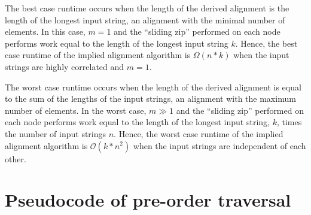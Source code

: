 \documentclass[11pt]{article}
\begin{document}
The best case runtime occurs when the length of the derived alignment is the length of the longest input string, an alignment with the minimal number of elements.
In this case, $m = 1$ and the ``sliding zip'' performed on each node performs work equal to the length of the longest input string $k$.
Hence, the best case runtime of the implied alignment algorithm is $\Omega(n*k)$ when the input strings are highly correlated and $m = 1$.

The worst case runtime occurs when the length of the derived alignment is equal to the sum of the lengths of the input strings, an alignment with the maximum number of elements.
In the worst case, $m \gg 1$ and the ``sliding zip'' performed on each node performs work equal to the length of the longest input string, $k$, times the number of input strings $n$.
Hence, the worst case runtime of the implied alignment algorithm is $\mathcal{O}(k * n^2)$ when the input strings are independent of each other.



\section{Pseudocode of pre-order traversal}
\end{document}
